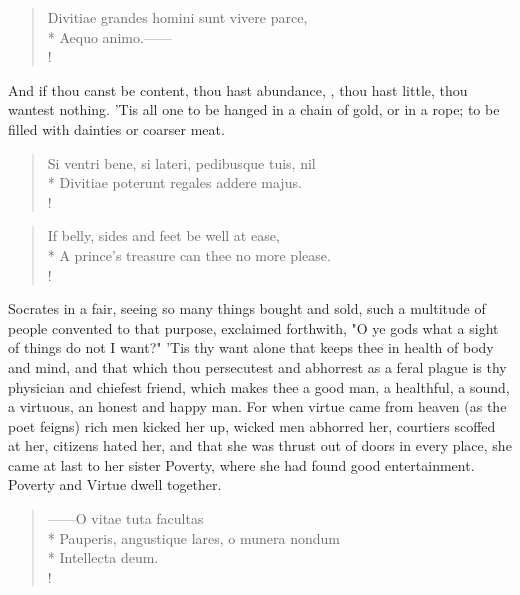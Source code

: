 {\begin{latin}
\begin{verse}%
Divitiae grandes homini sunt vivere parce,\\*
Aequo animo.------\\!
\end{verse}%
\end{latin}

And if thou canst be content, thou hast abundance, , thou hast little, thou wantest nothing. 'Tis all one to be hanged in a chain of gold, or in a rope; to be filled with dainties or coarser meat.

\begin{latin}
\begin{verse}%
Si ventri bene, si lateri, pedibusque tuis, nil\\*
Divitiae poterunt regales addere majus.\\!
\end{verse}%
\end{latin}



\begin{verse}%
If belly, sides and feet be well at ease,\\*
A prince's treasure can thee no more please.\\!
\end{verse}%

Socrates in a fair, seeing so many things bought and sold, such a multitude of people convented to that purpose, exclaimed forthwith, "O ye gods what a sight of things do not I want?" 'Tis thy want alone that keeps thee in health of body and mind, and that which thou persecutest and abhorrest as a feral plague is thy physician and chiefest friend, which makes thee a good man, a healthful, a sound, a virtuous, an honest and happy man. For when virtue came from heaven (as the poet feigns) rich men kicked her up, wicked men abhorred her, courtiers scoffed at her, citizens hated her, and that she was thrust out of doors in every place, she came at last to her sister Poverty, where she had found good entertainment. Poverty and Virtue dwell together.

\begin{latin}
\begin{verse}%
------O vitae tuta facultas\\*
Pauperis, angustique lares, o munera nondum\\*
Intellecta deum.\\!
\end{verse}%
\end{latin}

}
